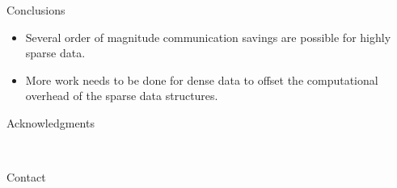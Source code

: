 \documentclass[final]{beamer}
\newlength{\onecolwid}
\begin{document}
\begin{frame}[t]
\begin{columns}[t]
\begin{column}{\onecolwid}
\begin{block}{Conclusions}
		\begin{itemize}
			\item Several order of magnitude communication savings
				are possible for highly sparse data.
			\item More work needs to be done for dense data to offset the computational
				overhead of the sparse data structures.
		\end{itemize}
		
	\end{block}
	
	
	
	
	
	
	\begin{block}{Acknowledgments}
	
	\small{} \\
	
	\end{block}
	
	
	
	\begin{alertblock}{Contact}
	

\end{alertblock}
\end{column}
\end{columns}
\end{frame}
\end{document}
